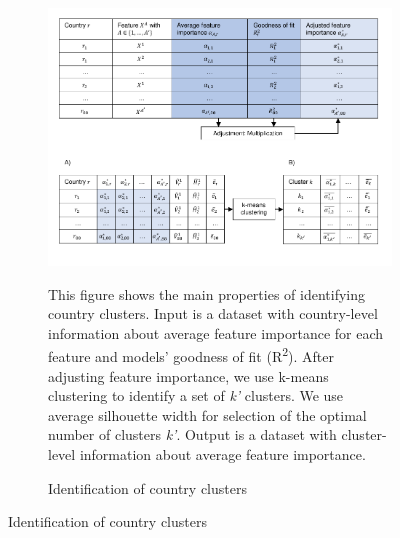 \begin{figure}[ht!]\ContinuedFloat
   \begin{subfigure}[b]{\textwidth}
  \centering
  \includegraphics{1_Figures/Figures_Appendix/Graphical representation of data work_3.pdf}
  \caption{Identification of country clusters} \label{fig:data_visualisation_3}
  \begin{subcaption2}
    This figure shows the main properties of identifying country clusters. Input is a dataset with country-level information about average feature importance for each feature and models' goodness of fit (R\textsuperscript{2}). After adjusting feature importance, we use k-means clustering to identify a set of \textit{k'} clusters. We use average silhouette width for selection of the optimal number of clusters \textit{k'}. Output is a dataset with cluster-level information about average feature importance.
  \end{subcaption2}
\end{subfigure}
\end{figure}